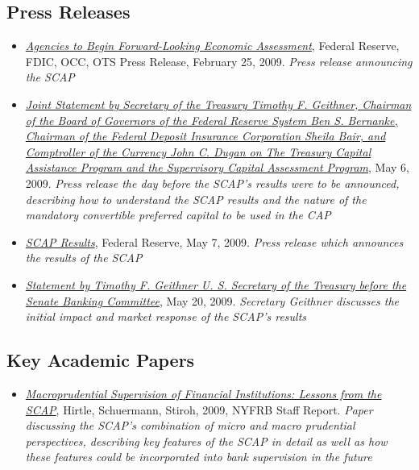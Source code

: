 \documentclass[justified, nobib]{tufte-handout2}
\begin{document}
\subsection{Press Releases}

\begin{itemize}
\item
  \href{http://www.federalreserve.gov/newsevents/press/bcreg/20090225a.htm}{\emph{Agencies
  to Begin Forward-Looking Economic Assessment}}, Federal Reserve, FDIC,
  OCC, OTS Press Release, February 25, 2009. \emph{Press release
  announcing the SCAP}
\item
  \href{http://www.federalreserve.gov/newsevents/press/bcreg/20090506a.htm}{\emph{Joint
  Statement by Secretary of the Treasury Timothy F. Geithner, Chairman
  of the Board of Governors of the Federal Reserve System Ben S.
  Bernanke, Chairman of the Federal Deposit Insurance Corporation Sheila
  Bair, and Comptroller of the Currency John C. Dugan on The Treasury
  Capital Assistance Program and the Supervisory Capital Assessment
  Program}}, May 6, 2009. \emph{Press release the day before the SCAP's
  results were to be announced, describing how to understand the SCAP
  results and the nature of the mandatory convertible preferred capital
  to be used in the CAP}
\item
  \href{http://www.federalreserve.gov/newsevents/press/bcreg/20090507a.htm}{\emph{SCAP
  Results}}, Federal Reserve, May 7, 2009. \emph{Press release which
  announces the results of the SCAP}
\item
  \href{https://www.treasury.gov/press-center/press-releases/Pages/tg139.aspx}{\emph{Statement
  by Timothy F. Geithner U. S. Secretary of the Treasury before the
  Senate Banking Committee}}, May 20, 2009. \emph{Secretary Geithner
  discusses the initial impact and market response of the SCAP's
  results}
\end{itemize}

\subsection{Key Academic Papers}

\begin{itemize}
\item
  \href{https://www.newyorkfed.org/medialibrary/media/research/staff_reports/sr409.pdf}{\emph{Macroprudential
  Supervision of Financial Institutions: Lessons from the SCAP}},
  Hirtle, Schuermann, Stiroh, 2009, NYFRB Staff Report. \emph{Paper
  discussing the SCAP's combination of micro and macro prudential
  perspectives, describing key features of the SCAP in detail as well as
  how these features could be incorporated into bank supervision in the
  future}
\end{itemize}
\end{document}
